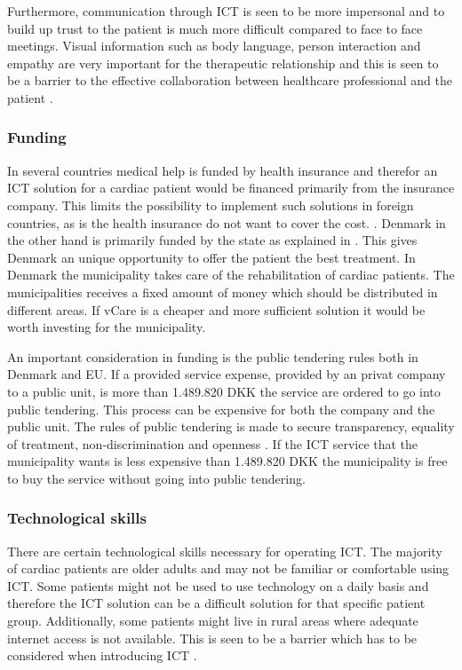 Furthermore, communication through ICT is seen to be more impersonal and to build up trust to the patient is much more difficult compared to face to face meetings. Visual information such as body language, person interaction and empathy are very important for the therapeutic relationship and this is seen to be a barrier to the effective collaboration between healthcare professional and the patient \cite{barrier}.  

\subsubsection{Funding}

In several countries medical help is funded by health insurance and therefor an ICT solution for a cardiac patient would be financed primarily from the insurance company. This limits the possibility to implement such solutions in foreign countries, as is the health insurance do not want to cover the cost. \cite{considerations}. Denmark in the other hand is primarily funded by the state as explained in . This gives Denmark an unique opportunity to offer the patient the best treatment. In Denmark the municipality takes care of the rehabilitation of cardiac patients. The municipalities receives a fixed amount of money which should be distributed in different areas. If vCare is a cheaper and more sufficient solution it would be worth investing for the municipality. 

An important consideration in funding is the public tendering rules both in Denmark and EU. If a provided service expense, provided by an privat company to a public unit, is more than 1.489.820 DKK the service are ordered to go into public tendering. This process can be expensive for both the company and the public unit. The rules of public tendering is made to secure transparency, equality of treatment, non-discrimination and openness \cite{udbud}. If the ICT service that the municipality wants is less expensive than 1.489.820 DKK the municipality is free to buy the service without going into public tendering. 

\subsubsection{Technological skills}
There are certain technological skills necessary for operating ICT. The majority of cardiac patients are older adults and may not be familiar or comfortable using ICT. Some patients might not be used to use technology on a daily basis and therefore the ICT solution can be a difficult solution for that specific patient group. Additionally, some patients might live in rural areas where adequate internet access is not available. This is seen to be a barrier which has to be considered when introducing ICT \cite{barrier}.  
   
